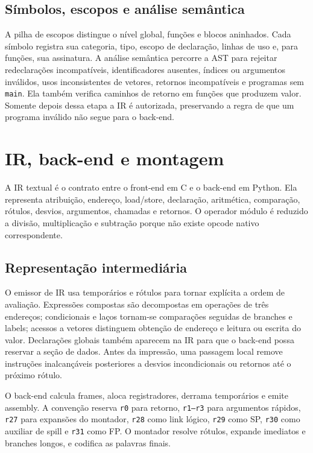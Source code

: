 \documentclass[
  12pt,
  oneside,
  a4paper,
  english,
  french,
  spanish,
  brazilian,
]{abntex2}
\begin{document}
\subsection{Símbolos, escopos e análise semântica}

A pilha de escopos distingue o nível global, funções e blocos aninhados. Cada símbolo registra sua categoria, tipo, escopo de declaração, linhas de uso e, para funções, sua assinatura. A análise semântica percorre a AST para rejeitar redeclarações incompatíveis, identificadores ausentes, índices ou argumentos inválidos, usos inconsistentes de vetores, retornos incompatíveis e programas sem \texttt{main}. Ela também verifica caminhos de retorno em funções que produzem valor. Somente depois dessa etapa a IR é autorizada, preservando a regra de que um programa inválido não segue para o back-end.

\section{IR, back-end e montagem}

A IR textual é o contrato entre o front-end em C e o back-end em Python. Ela representa atribuição, endereço, load/store, declaração, aritmética, comparação, rótulos, desvios, argumentos, chamadas e retornos. O operador módulo é reduzido a divisão, multiplicação e subtração porque não existe opcode nativo correspondente.

\subsection{Representação intermediária}

O emissor de IR usa temporários e rótulos para tornar explícita a ordem de avaliação. Expressões compostas são decompostas em operações de três endereços; condicionais e laços tornam-se comparações seguidas de branches e labels; acessos a vetores distinguem obtenção de endereço e leitura ou escrita do valor. Declarações globais também aparecem na IR para que o back-end possa reservar a seção de dados. Antes da impressão, uma passagem local remove instruções inalcançáveis posteriores a desvios incondicionais ou retornos até o próximo rótulo.

O back-end calcula frames, aloca registradores, derrama temporários e emite assembly. A convenção reserva \texttt{r0} para retorno, \texttt{r1--r3} para argumentos rápidos, \texttt{r27} para expansões do montador, \texttt{r28} como link lógico, \texttt{r29} como SP, \texttt{r30} como auxiliar de spill e \texttt{r31} como FP. O montador resolve rótulos, expande imediatos e branches longos, e codifica as palavras finais.
\end{document}
